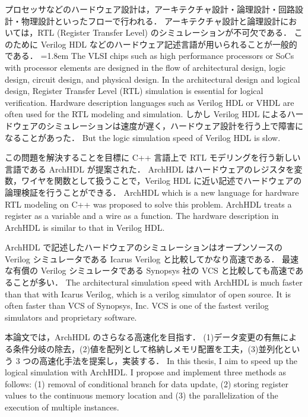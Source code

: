 プロセッサなどのハードウェア設計は，アーキテクチャ設計・論理設計・回路設計・物理設計といったフローで行われる．
アーキテクチャ設計と論理設計においては，RTL (Register Transfer Level) のシミュレーションが不可欠である．
このために Verilog HDL などのハードウェア記述言語が用いられることが一般的である．
\fi
\parindent=1.8em
The VLSI chips such as high performance processors or SoCs with processor elements are designed in the flow of architectural design,
logic design, circuit design, and physical design.
In the architectural design and logical design, Register Transfer Level (RTL) simulation is essential for logical verification.
Hardware description languages such as Verilog HDL or VHDL are often used for the RTL modeling and simulation.
しかし Verilog HDL によるハードウェアのシミュレーションは速度が遅く，ハードウェア設計を行う上で障害になることがあった．
\fi
But the logic simulation speed of Verilog HDL is slow.

この問題を解決することを目標に C++ 言語上で RTL モデリングを行う新しい言語である ArchHDL が提案された．
ArchHDL はハードウェアのレジスタを変数，ワイヤを関数として扱うことで，Verilog HDL に近い記述でハードウェアの論理検証を行うことができる．
\fi
ArchHDL which is a new language for hardware RTL modeling on C++ was proposed to solve this problem.
ArchHDL treats a register as a variable and a wire as a function.
The hardware description in ArchHDL is similar to that in Verilog HDL.

ArchHDL で記述したハードウェアのシミュレーションはオープンソースの Verilog シミュレータである Icarus Verilog と比較してかなり高速である．
最速な有償の Verilog シミュレータである Synopsys 社の VCS と比較しても高速であることが多い．
\fi
The architectural simulation speed with ArchHDL is much faster than
that with Icarus Verilog, which is a verilog simulator of open source.
It is often faster than VCS of Synopsys, Inc.
VCS is one of the fastest verilog simulators and proprietary software.

本論文では，ArchHDL のさらなる高速化を目指す．
(1)データ変更の有無による条件分岐の除去，(2)値を配列として格納しメモリ配置を工夫，(3)並列化という 3 つの高速化手法を提案し，実装する．
\fi
In this thesis, I aim to speed up the logical simulation with ArchHDL.
I propose and implement three methods as follows:
(1) removal of conditional branch for data update,
(2) storing register values to the continuous memory location
and (3) the parallelization of the execution of multiple instances.

